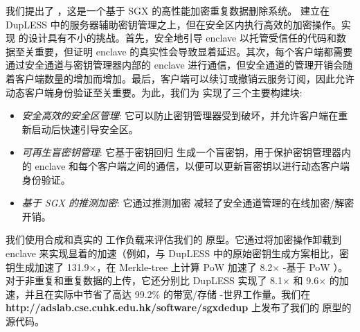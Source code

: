 我们提出了 \sysnameS，这是一个基于 SGX 的高性能加密重复数据删除系统。 \sysnameS 建立在 DupLESS \cite{bellare13b} 中的服务器辅助密钥管理之上，但在安全区内执行高效的加密操作。实现 \sysnameS 的设计具有不小的挑战。首先，安全地引导 enclave 以托管受信任的代码和数据至关重要，但证明 enclave 的真实性会导致显着延迟。其次，每个客户端都需要通过安全通道与密钥管理器内部的 enclave 进行通信，但安全通道的管理开销会随着客户端数量的增加而增加。最后，客户端可以续订或撤销云服务订阅，因此允许动态客户端身份验证至关重要。为此，我们为 \sysnameS 实现了三个主要构建块: 

\begin{itemize}[leftmargin=*]
    \item \textit{ 安全高效的安全区管理}:
        它可以防止密钥管理器受到破坏，并允许客户端在重新启动后快速引导安全区。
    \item \textit{ 可再生盲密钥管理}:
        它基于密钥回归 \cite{fu06} 生成一个盲密钥，用于保护密钥管理器内的 enclave 和每个客户端之间的通信，以便可以更新盲密钥以进行动态客户端身份验证。
    \item \textit{ 基于 SGX 的推测加密}:
        它通过推测加密 \cite{eduardo19} 减轻了安全通道管理的在线加密/解密开销。
\end{itemize}

我们使用合成和真实的 \cite{fsl,meyer11} 工作负载来评估我们的 \sysnameS 原型。它通过将加密操作卸载到 enclave 来实现显着的加速（例如，与 DupLESS \cite{bellare13b} 中的原始密钥生成方案相比，密钥生成加速了 131.9$\times$，在 Merkle-tree 上计算 PoW 加速了 8.2$\times$ -基于 PoW \cite{halevi11}）。对于非重复和重复数据的上传，它还分别比 DupLESS \cite{bellare13b} 实现了 8.1$\times$ 和 9.6$\times$ 的加速，并且在实际中节省了高达 99.2\% 的带宽/存储 -世界工作量。我们在 {\bf http://adslab.cse.cuhk.edu.hk/software/sgxdedup} 上发布了我们的 \sysnameS 原型的源代码。 

